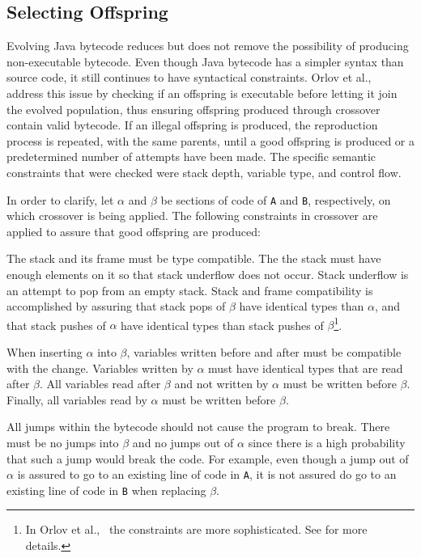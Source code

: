 \documentclass{sig-alternate}
\begin{document}
\subsection{Selecting Offspring}
Evolving Java bytecode reduces but does not remove the possibility of producing non-executable bytecode. Even though Java bytecode has a simpler syntax than source code, it still continues to have syntactical constraints. Orlov et al.,~\cite{FINCH2:2009} address this issue by checking if an offspring is executable before letting it join the evolved population, thus ensuring offspring produced through crossover contain valid bytecode. If an illegal offspring is produced, the reproduction process is repeated, with the same parents, until a good offspring is produced or a predetermined number of attempts have been made. The specific semantic constraints that were checked were stack depth, variable type, and control flow.\par

In order to clarify, let $\alpha$ and $\beta$ be sections of code of \texttt{A} and \texttt{B}, respectively, on which crossover is being applied.
The following constraints in crossover are applied to assure that good offspring are produced:\par

The stack and its frame must be type compatible. The the stack must have enough elements on it so that stack underflow does not occur. Stack underflow is an attempt to pop from an empty stack. Stack and frame compatibility is accomplished by assuring that stack pops of $\beta$ have identical types than $\alpha$, and that stack pushes of $\alpha$ have identical types than stack pushes of $\beta$\footnote{In Orlov et al.,~\cite{FINCH2:2009} the constraints are more sophisticated. See \cite{FINCH2:2009} for more details.}. \par

When inserting $\alpha$ into $\beta$, variables written before and after must be compatible with the change. Variables written by $\alpha$ must have identical types that are read after $\beta$. All variables read after $\beta$ and not written by $\alpha$ must be written before $\beta$. Finally, all variables read by $\alpha$ must be written before $\beta$.\par

All jumps within the bytecode should not cause the program to break. There must be no jumps into $\beta$ and no jumps out of $\alpha$ since there is a high probability that such a jump would break the code. For example, even though a jump out of $\alpha$ is assured to go to an existing line of code in \texttt{A}, it is not assured do go to an existing line of code in \texttt{B} when replacing $\beta$.
\end{document}
